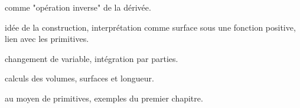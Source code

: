 




  comme "opération inverse" de la dérivée.

     idée de la construction, interprétation comme surface sous une fonction positive, lien avec les primitives.

     changement de variable, int\'egration par parties.

     calculs des volumes, surfaces et longueur.


  au moyen de primitives, exemples du premier chapitre.

